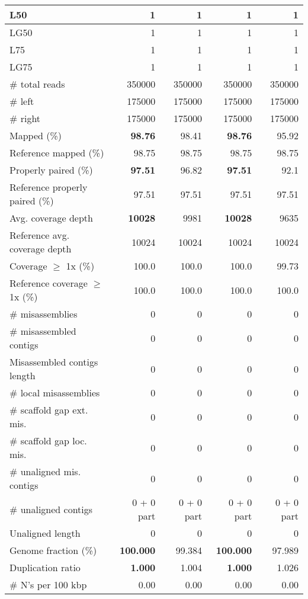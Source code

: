\documentclass[12pt,a4paper]{article}
\begin{document}
\begin{table}[ht]
\begin{center}
\begin{tabular}{|l*{4}{|r}|}
L50 & 1 & 1 & 1 & 1 \\ \hline
LG50 & 1 & 1 & 1 & 1 \\ \hline
L75 & 1 & 1 & 1 & 1 \\ \hline
LG75 & 1 & 1 & 1 & 1 \\ \hline
\# total reads & 350000 & 350000 & 350000 & 350000 \\ \hline
\# left & 175000 & 175000 & 175000 & 175000 \\ \hline
\# right & 175000 & 175000 & 175000 & 175000 \\ \hline
Mapped (\%) & {\bf 98.76} & 98.41 & {\bf 98.76} & 95.92 \\ \hline
Reference mapped (\%) & 98.75 & 98.75 & 98.75 & 98.75 \\ \hline
Properly paired (\%) & {\bf 97.51} & 96.82 & {\bf 97.51} & 92.1 \\ \hline
Reference properly paired (\%) & 97.51 & 97.51 & 97.51 & 97.51 \\ \hline
Avg. coverage depth & {\bf 10028} & 9981 & {\bf 10028} & 9635 \\ \hline
Reference avg. coverage depth & 10024 & 10024 & 10024 & 10024 \\ \hline
Coverage $\geq$ 1x (\%) & 100.0 & 100.0 & 100.0 & 99.73 \\ \hline
Reference coverage $\geq$ 1x (\%) & 100.0 & 100.0 & 100.0 & 100.0 \\ \hline
\# misassemblies & 0 & 0 & 0 & 0 \\ \hline
\# misassembled contigs & 0 & 0 & 0 & 0 \\ \hline
Misassembled contigs length & 0 & 0 & 0 & 0 \\ \hline
\# local misassemblies & 0 & 0 & 0 & 0 \\ \hline
\# scaffold gap ext. mis. & 0 & 0 & 0 & 0 \\ \hline
\# scaffold gap loc. mis. & 0 & 0 & 0 & 0 \\ \hline
\# unaligned mis. contigs & 0 & 0 & 0 & 0 \\ \hline
\# unaligned contigs & 0 + 0 part & 0 + 0 part & 0 + 0 part & 0 + 0 part \\ \hline
Unaligned length & 0 & 0 & 0 & 0 \\ \hline
Genome fraction (\%) & {\bf 100.000} & 99.384 & {\bf 100.000} & 97.989 \\ \hline
Duplication ratio & {\bf 1.000} & 1.004 & {\bf 1.000} & 1.026 \\ \hline
\# N's per 100 kbp & 0.00 & 0.00 & 0.00 & 0.00 \\ \hline

\end{tabular}
\end{center}
\end{table}
\end{document}
